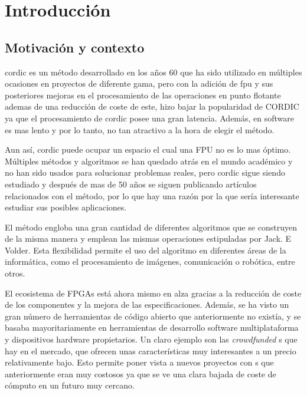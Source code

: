 
\chapter{Introducción}
\section{Motivación y contexto}
\label{motivacion}

\gls{cordic} es un método desarrollado en los años 60 que ha sido utilizado en múltiples ocasiones en proyectos de diferente gama, pero con la adición de \gls{fpu} y sus posteriores mejoras en el procesamiento de las operaciones en punto flotante ademas de una reducción de coste de este, hizo bajar la popularidad de CORDIC ya que el procesamiento de \gls{cordic} posee una gran latencia. Además, en software es mas lento y por lo tanto, no tan atractivo a la hora de elegir el método.

Aun así, \gls{cordic} puede ocupar un espacio el cual una FPU no es lo mas óptimo. Múltiples métodos y algoritmos se han quedado atrás en el mundo académico y no han sido usados para solucionar problemas reales, pero \gls{cordic} sigue siendo estudiado y después de mas de 50 años se siguen publicando artículos relacionados con el método, por lo que hay una razón por la que sería interesante estudiar sus posibles aplicaciones.

El método engloba una gran cantidad de diferentes algoritmos que se construyen de la misma manera y emplean las mismas operaciones estipuladas por Jack. E Volder. Esta flexibilidad permite el uso del algoritmo en diferentes áreas de la informática, como el procesamiento de imágenes, comunicación o robótica, entre otros.

El ecosistema de FPGAs está ahora mismo en alza gracias a la reducción de coste de los componentes y la mejora de las especificaciones. Además, se ha visto un gran número de herramientas de código abierto que anteriormente no existía, y se basaba mayoritariamente en herramientas de desarrollo software multiplataforma y dispositivos hardware propietarios. Un claro ejemplo son las \textit{crowdfunded} s que hay en el mercado, que ofrecen unas características muy interesantes a un precio relativamente bajo. Esto permite poner vista a nuevos proyectos con s que anteriormente eran muy costosos ya que se ve una clara bajada de coste de cómputo en un futuro muy cercano.

